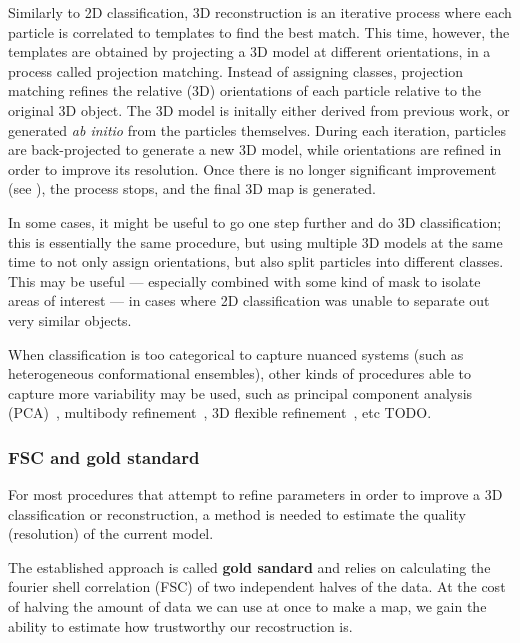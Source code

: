 Similarly to 2D classification, 3D reconstruction is an iterative process where each particle is correlated to templates to find the best match.
This time, however, the templates are obtained by projecting a 3D model at different orientations, in a process called projection matching.
Instead of assigning classes, projection matching refines the relative (3D) orientations of each particle relative to the original 3D object.
The 3D model is initally either derived from previous work, or generated \textit{ab initio} from the particles themselves.
During each iteration, particles are back-projected to generate a new 3D model, while orientations are refined in order to improve its resolution.
Once there is no longer significant improvement (see ), the process stops, and the final 3D map is generated.

In some cases, it might be useful to go one step further and do 3D classification; this is essentially the same procedure, but using multiple 3D models at the same time to not only assign orientations, but also split particles into different classes.
This may be useful --- especially combined with some kind of mask to isolate areas of interest --- in cases where 2D classification was unable to separate out very similar objects.

When classification is too categorical to capture nuanced systems (such as heterogeneous conformational ensembles), other kinds of procedures able to capture more variability may be used, such as principal component analysis (PCA)~\cite{castano-diezDynamoFlexibleUserfriendly2012,punjani3DVariabilityAnalysis2021}, multibody refinement~\cite{nakaneMultibodyRefinementCryoEM2021}, 3D flexible refinement~\cite{punjani3DFlexibleRefinement2022}, etc TODO.

\subsubsection{FSC and gold standard}\label{em_fsc}
For most procedures that attempt to refine parameters in order to improve a 3D classification or reconstruction, a method is needed to estimate the quality (resolution) of the current model.

The established approach is called \textbf{gold sandard} and relies on calculating the fourier shell correlation (FSC) of two independent halves of the data.
At the cost of halving the amount of data we can use at once to make a map, we gain the ability to estimate how trustworthy our recostruction is.

